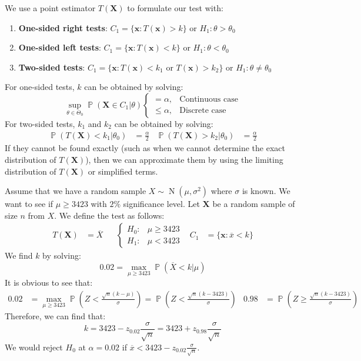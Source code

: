 \documentclass{huhtakm-template-book-v2}
\DeclareMathOperator{\prob}{\mathbb{P}}
\DeclareMathOperator{\N}{N}
\begin{document}
\begin{rem}
	We use a point estimator $T(\mathbf{X})$ to formulate our test with:
	\begin{enumerate}
		\item \textbf{One-sided right tests}: $C_{1}=\{\mathbf{x}:T(\mathbf{x})>k\}$ or $H_{1}:\theta>\theta_{0}$
		\item \textbf{One-sided left tests}: $C_{1}=\{\mathbf{x}:T(\mathbf{x})<k\}$ or $H_{1}:\theta<\theta_{0}$
		\item \textbf{Two-sided tests}: $C_{1}=\{\mathbf{x}:T(\mathbf{x})<k_{1}\text{ or }T(\mathbf{x})>k_{2}\}$ or $H_{1}:\theta\neq\theta_{0}$
	\end{enumerate}
	For one-sided tests, $k$ can be obtained by solving:
	\begin{equation*}
		\sup_{\theta\in\Theta_{0}}\prob(\mathbf{X}\in C_{1}|\theta)\begin{cases}
			=\alpha, &\text{Continuous case}\\
			\leq\alpha, &\text{Discrete case}
		\end{cases}
	\end{equation*}
	For two-sided tests, $k_{1}$ and $k_{2}$ can be obtained by solving:
	\begin{align*}
		\prob(T(\mathbf{X})<k_{1}|\theta_{0})&=\frac{\alpha}{2} & \prob(T(\mathbf{X})>k_{2}|\theta_{0})&=\frac{\alpha}{2}
	\end{align*}
	If they cannot be found exactly (such as when we cannot determine the exact distribution of $T(\mathbf{X})$), then we can approximate them by using the limiting distribution of $T(\mathbf{X})$ or simplified terms.
\end{rem}
\begin{eg}
	Assume that we have a random sample $X\sim\N(\mu,\sigma^{2})$ where $\sigma$ is known. We want to see if $\mu\geq 3423$ with $2\%$ significance level. Let $\mathbf{X}$ be a random sample of size $n$ from $X$. We define the test as follows:
	\begin{align*}
		T(\mathbf{X})&=\overline{X} & &\begin{cases}
			H_{0}: &\mu\geq3423\\
			H_{1}: &\mu<3423
		\end{cases} & C_{1}&=\{\mathbf{x}:\overline{x}<k\}
	\end{align*}
	We find $k$ by solving:
	\begin{equation*}
		0.02=\max_{\mu\geq3423}\prob(\overline{X}<k|\mu)
	\end{equation*}
	It is obvious to see that:
	\begin{align*}
		0.02&=\max_{\mu\geq3423}\prob\left(Z<\frac{\sqrt{n}(k-\mu)}{\sigma}\right)=\prob\left(Z<\frac{\sqrt{n}(k-3423)}{\sigma}\right) & 0.98&=\prob\left(Z\geq\frac{\sqrt{n}(k-3423)}{\sigma}\right)
	\end{align*}
	Therefore, we can find that:
	\begin{equation*}
		k=3423-z_{0.02}\frac{\sigma}{\sqrt{n}}=3423+z_{0.98}\frac{\sigma}{\sqrt{n}}
	\end{equation*}
	We would reject $H_{0}$ at $\alpha=0.02$ if $\overline{x}<3423-z_{0.02}\frac{\sigma}{\sqrt{n}}$.
\end{eg}
\end{document}
